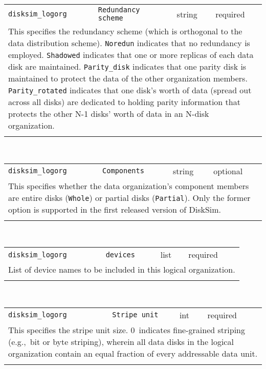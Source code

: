 \begin{tabular}{|p{\lpmodwidth}|p{\lpnamewidth}|p{0.5in}|p{0.5in}|}
\cline{1-4}
\texttt{disksim\_logorg} & \texttt{Redundancy scheme} & string & required \\ 
\cline{1-4}
\multicolumn{4}{|p{6in}|}{
This specifies the redundancy scheme (which is orthogonal to the data
distribution scheme).
\texttt{Noredun} indicates that no redundancy is employed.
\texttt{Shadowed} indicates that one or more replicas of each data disk are
maintained.
\texttt{Parity\_disk} indicates that one parity disk is maintained to
protect the data of the other organization members.
\texttt{Parity\_rotated} indicates that one disk's worth of data (spread
out across all disks) are dedicated to holding parity information that
protects the other N-1 disks' worth of data in an N-disk organization.
}\\ 
\cline{1-4}
\multicolumn{4}{p{5in}}{}\\
\end{tabular}\\ 
\noindent 
\begin{tabular}{|p{\lpmodwidth}|p{\lpnamewidth}|p{0.5in}|p{0.5in}|}
\cline{1-4}
\texttt{disksim\_logorg} & \texttt{Components} & string & optional \\ 
\cline{1-4}
\multicolumn{4}{|p{6in}|}{
This specifies whether the data organization's component members are entire
disks (\texttt{Whole}) or partial disks (\texttt{Partial}). Only the former
option is supported in the first released version of DiskSim.
}\\ 
\cline{1-4}
\multicolumn{4}{p{5in}}{}\\
\end{tabular}\\ 
\noindent 
\begin{tabular}{|p{\lpmodwidth}|p{\lpnamewidth}|p{0.5in}|p{0.5in}|}
\cline{1-4}
\texttt{disksim\_logorg} & \texttt{devices} & list & required \\ 
\cline{1-4}
\multicolumn{4}{|p{6in}|}{
List of device names to be included in this logical organization.
}\\ 
\cline{1-4}
\multicolumn{4}{p{5in}}{}\\
\end{tabular}\\ 
\noindent 
\begin{tabular}{|p{\lpmodwidth}|p{\lpnamewidth}|p{0.5in}|p{0.5in}|}
\cline{1-4}
\texttt{disksim\_logorg} & \texttt{Stripe unit} & int & required \\ 
\cline{1-4}
\multicolumn{4}{|p{6in}|}{
This specifies the stripe unit size. 0~indicates fine-grained striping
(e.g.,~bit or byte striping), wherein all data disks in the logical
organization contain an equal fraction of every addressable data unit.
}\\ 
\cline{1-4}
\multicolumn{4}{p{5in}}{}\\
\end{tabular}\\ 
